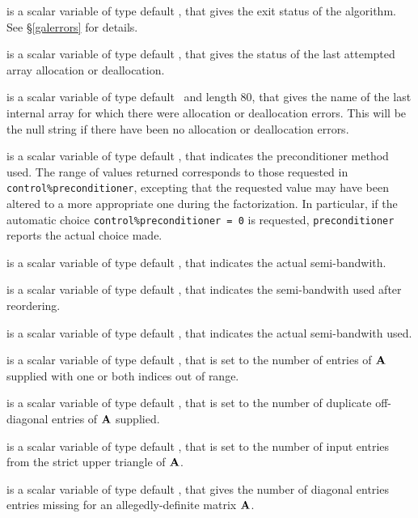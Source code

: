 \documentclass{galahad}
\begin{document}
\begin{description}

 is a scalar variable of type default \integer, that gives the
exit status of the algorithm.
See \S\ref{galerrors}
for details.

 is a scalar variable of type default \integer, that gives
the status of the last attempted array allocation or deallocation.

 is a scalar variable of type default \character\
and length 80, that  gives the name of the last internal array
for which there were allocation or deallocation errors.
This will be the null string if there have been no
allocation or deallocation errors.

 is a scalar variable of type default \integer,
that indicates the preconditioner method used. The range of values returned
corresponds to those requested in {\tt control\%preconditioner},
excepting that the requested value may have been altered to a more
appropriate one during the factorization. In particular, if the automatic
choice {\tt control\%preconditioner = 0} is requested,
{\tt preconditioner} reports the actual choice made.

 is a scalar variable of type default \integer,
that indicates the actual semi-bandwith.

 is a scalar variable of type default \integer,
that indicates the semi-bandwith used after reordering.

 is a scalar variable of type default \integer,
that indicates the actual semi-bandwith used.

 is a scalar variable of type default \integer,
that is set to the number of
entries of ${\mathbf{A}}$ supplied with one or both indices out of range.

 is a scalar variable of type default \integer,
that is set to the number of duplicate off-diagonal entries of ${\mathbf{A}}$ supplied.

 is a scalar variable of type default \integer,
that is set to the number of input entries from the strict upper triangle
of ${\mathbf{A}}$.

 is a scalar variable of type default \integer,
that gives the number of diagonal entries entries missing for an
allegedly-definite matrix ${\mathbf{A}}$.


\end{description}
\end{document}
